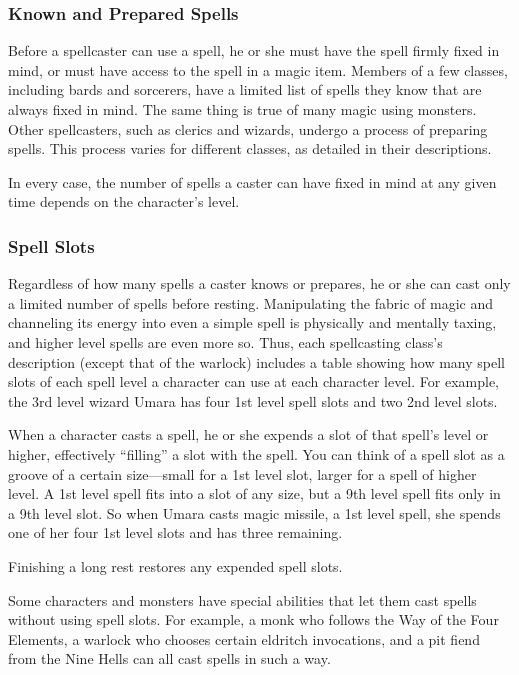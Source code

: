 \documentclass[
]{article}
\begin{document}
\hypertarget{known-and-prepared-spells}{%
\subsubsection{Known and Prepared
Spells}\label{known-and-prepared-spells}}

Before a spellcaster can use a spell, he or she must have the spell
firmly fixed in mind, or must have access to the spell in a magic item.
Members of a few classes, including bards and sorcerers, have a limited
list of spells they know that are always fixed in mind. The same thing
is true of many magic using monsters. Other spellcasters, such as
clerics and wizards, undergo a process of preparing spells. This process
varies for different classes, as detailed in their descriptions.

In every case, the number of spells a caster can have fixed in mind at
any given time depends on the character's level.

\hypertarget{spell-slots}{%
\subsubsection{Spell Slots}\label{spell-slots}}

Regardless of how many spells a caster knows or prepares, he or she can
cast only a limited number of spells before resting. Manipulating the
fabric of magic and channeling its energy into even a simple spell is
physically and mentally taxing, and higher level spells are even more
so. Thus, each spellcasting class's description (except that of the
warlock) includes a table showing how many spell slots of each spell
level a character can use at each character level. For example, the 3rd
level wizard Umara has four 1st level spell slots and two 2nd level
slots.

When a character casts a spell, he or she expends a slot of that spell's
level or higher, effectively ``filling'' a slot with the spell. You can
think of a spell slot as a groove of a certain size---small for a 1st
level slot, larger for a spell of higher level. A 1st level spell fits
into a slot of any size, but a 9th level spell fits only in a 9th level
slot. So when Umara casts magic missile, a 1st level spell, she spends
one of her four 1st level slots and has three remaining.

Finishing a long rest restores any expended spell slots.

Some characters and monsters have special abilities that let them cast
spells without using spell slots. For example, a monk who follows the
Way of the Four Elements, a warlock who chooses certain eldritch
invocations, and a pit fiend from the Nine Hells can all cast spells in
such a way.
\end{document}
